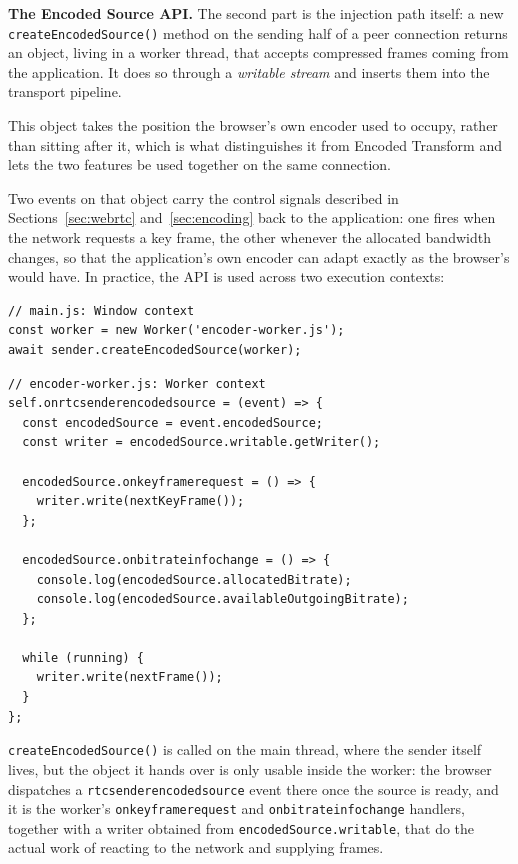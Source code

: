 \documentclass[11pt]{article}
\begin{document}
\textbf{The Encoded Source API.} The second part is the injection path itself: a new \texttt{createEncodedSource()} method on the sending half of a peer connection returns an object, living in a worker thread, that accepts compressed frames coming  from the application. It does so through a \textit{writable stream} and inserts them into the transport pipeline.

This object takes the position the browser's own encoder used to occupy, rather than sitting after it, which is what distinguishes it from Encoded Transform and lets the two features be used together on the same connection.

Two events on that object carry the control signals described in Sections~\ref{sec:webrtc} and~\ref{sec:encoding} back to the application: one fires when the network requests a key frame, the other whenever the allocated bandwidth changes, so that the application's own encoder can adapt exactly as the browser's would have. In practice, the API is used across two execution contexts:
\\
\begin{lstlisting}[language=JS]
// main.js: Window context
const worker = new Worker('encoder-worker.js');
await sender.createEncodedSource(worker);
\end{lstlisting}

\begin{lstlisting}[language=JS]
// encoder-worker.js: Worker context
self.onrtcsenderencodedsource = (event) => {
  const encodedSource = event.encodedSource;
  const writer = encodedSource.writable.getWriter();

  encodedSource.onkeyframerequest = () => {
    writer.write(nextKeyFrame());
  };

  encodedSource.onbitrateinfochange = () => {
    console.log(encodedSource.allocatedBitrate);
    console.log(encodedSource.availableOutgoingBitrate);
  };

  while (running) {
    writer.write(nextFrame());
  }
};
\end{lstlisting}

\texttt{createEncodedSource()} is called on the main thread, where the sender itself lives, but the object it hands over is only usable inside the worker: the browser dispatches a \texttt{rtcsenderencodedsource} event there once the source is ready, and it is the worker's \texttt{onkeyframerequest} and \texttt{onbitrateinfochange} handlers, together with a writer obtained from \texttt{encodedSource.writable}, that do the actual work of reacting to the network and supplying frames.
\end{document}
